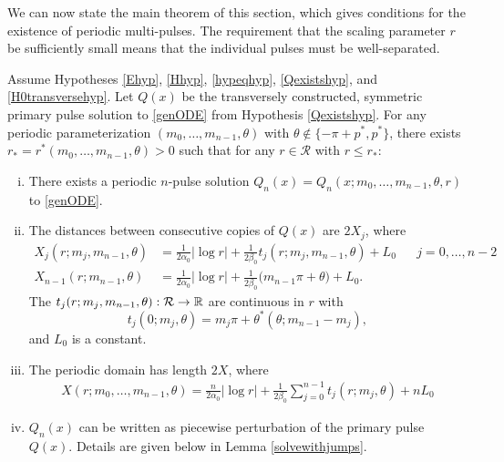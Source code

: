 \documentclass[thesis.tex]{subfiles}
\begin{document}
We can now state the main theorem of this section, which gives conditions for the existence of periodic multi-pulses. The requirement that the scaling parameter $r$ be sufficiently small means that the individual pulses must be well-separated. 

\begin{theorem}\label{perexist}
Assume Hypotheses \ref{Ehyp}, \ref{Hhyp}, \ref{hypeqhyp}, \ref{Qexistshyp}, and \ref{H0transversehyp}. Let $Q(x)$ be the transversely constructed, symmetric primary pulse solution to \eqref{genODE} from Hypothesis \ref{Qexistshyp}. For any periodic parameterization $(m_0, \dots, m_{n-1}, \theta)$ with $\theta \notin \{-\pi + p^*, p^* \}$, there exists $r_* = r^*(m_0, \dots, m_{n-1}, \theta) > 0$ such that for any $r \in \mathcal{R}$ with $r \leq r_*$:
\begin{enumerate}[(i)]
	\item There exists a periodic $n$-pulse solution $Q_n(x) = Q_n(x; m_0, \dots, m_{n-1}, \theta, r)$ to \eqref{genODE}.

	\item The distances between consecutive copies of $Q(x)$ are $2X_j$, where
	\begin{align}\label{Xj}
		X_j(r; m_j, m_{n-1},\theta) &= \frac{1}{2 \alpha_0} |\log r| + \frac{1}{2\beta_0} t_j(r; m_j,m_{n-1}, \theta) + L_0 && j = 0, \dots, n-2 \\
		X_{n-1}(r; m_{n-1}, \theta) &= \frac{1}{2 \alpha_0} |\log r| + \frac{1}{2 \beta_0}\big( m_{n-1}\pi + \theta \big) + L_0.
	\end{align}
	The $t_j(r; m_j, m_{n-1}, \theta): \mathcal{R} \rightarrow \mathbb{R}$ are continuous in $r$ with 
	\[
	t_j(0; m_j, \theta) = m_j \pi + \theta^*(\theta; m_{n-1} - m_j),
	\]
	and $L_0$ is a constant.

	\item The periodic domain has length $2X$, where
	\begin{align}\label{Xdomain}
	X(r; m_0, \dots, m_{n-1}, \theta) = \frac{n}{2\alpha_0} |\log r| + \frac{1}{2\beta_0} \sum_{j=0}^{n-1} t_j(r; m_j, \theta) + n L_0
	\end{align}

	\item $Q_n(x)$ can be written as piecewise perturbation of the primary pulse $Q(x)$. Details are given below in Lemma \ref{solvewithjumps}.
\end{enumerate}
\end{theorem}
\end{document}
